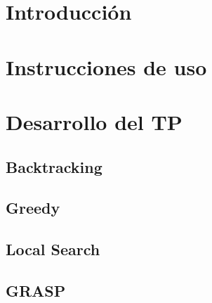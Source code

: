 \documentclass[12pt, a4paper, twoside]{article}
\begin{document}
{}

\newpage{\pagestyle{empty}\cleardoublepage}
\setcounter{page}{1}

\newpage{\pagestyle{empty}\tableofcontents\cleardoublepage}

\begin{TP3}
\section{Introducción}\label{sec:introduccion}

\newpage
\section{Instrucciones de uso}\label{sec:instrucciones}

\newpage

\section{Desarrollo del TP}\label{sec:desarrollo}
  
  \subsection{Backtracking}\label{subsec:backtracking}
  
  \newpage

  \subsection{Greedy}\label{subsec:greedy}
  
  \newpage

  \subsection{Local Search}\label{subsec:local}
  
  \newpage

  \subsection{GRASP}\label{subsec:grasp}
  
  \newpage


\end{TP3}
\end{document}
